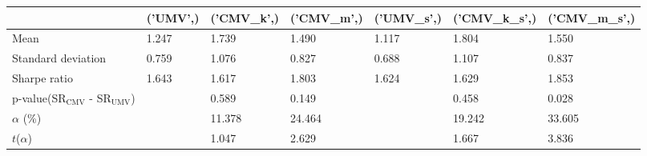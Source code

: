 \begin{tabular}{lllllll}
\toprule
 & ('UMV',) & ('CMV_k',) & ('CMV_m',) & ('UMV_s',) & ('CMV_k_s',) & ('CMV_m_s',) \\
\midrule
Mean & 1.247 & 1.739 & 1.490 & 1.117 & 1.804 & 1.550 \\
Standard deviation & 0.759 & 1.076 & 0.827 & 0.688 & 1.107 & 0.837 \\
Sharpe ratio & 1.643 & 1.617 & 1.803 & 1.624 & 1.629 & 1.853 \\
p-value(SR$_{\text{CMV}}$ - SR$_{\text{UMV}}$) &  & 0.589 & 0.149 &  & 0.458 & 0.028 \\
$\alpha$ (\%) &  & 11.378 & 24.464 &  & 19.242 & 33.605 \\
$t$($\alpha$) &  & 1.047 & 2.629 &  & 1.667 & 3.836 \\
\bottomrule
\end{tabular}
